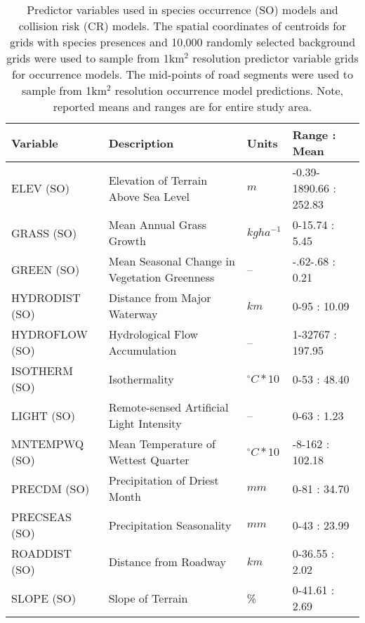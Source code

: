 \begin{table}[htp]
\caption[Predictor variables used in species occurrence models and collision risk models]{Predictor variables used in species occurrence (SO) models and collision risk (CR) models. The spatial coordinates of centroids for grids with species presences and 10,000 randomly selected background grids were used to sample from 1km$^2$ resolution predictor variable grids for occurrence models. The mid-points of road segments were used to sample from 1km$^2$ resolution occurrence model predictions. Note, reported means and ranges are for entire study area.}
\centering
\begin{tabularx}{0.9\textwidth}{lYll} \toprule
Variable       &Description                                               &Units          &Range : Mean\\
\midrule 
ELEV (SO)       &Elevation of Terrain Above Sea Level                     &$m$			  &-0.39-1890.66 : 252.83\\
GRASS (SO)      &Mean Annual Grass Growth \citep{cart03}	              &$kg ha^{-1}$   &0-15.74 : 5.45\\
GREEN (SO)      &Mean Seasonal Change in Vegetation Greenness             &--             &-.62-.68 : 0.21\\
HYDRODIST (SO)  &Distance from Major Waterway                             &$km$           &0-95 : 10.09\\
HYDROFLOW (SO)  &Hydrological Flow Accumulation                           &--             &1-32767 : 197.95\\
ISOTHERM (SO)   &Isothermality                                            &$^{\circ}C*10$ &0-53 : 48.40\\
LIGHT (SO)      &Remote-sensed Artificial Light Intensity                 &--             &0-63 : 1.23\\
MNTEMPWQ (SO)   &Mean Temperature of Wettest Quarter                      &$^{\circ}C*10$ &-8-162 : 102.18\\
PRECDM (SO)     &Precipitation of Driest Month                            &$mm$           &0-81 : 34.70\\
PRECSEAS (SO)   &Precipitation Seasonality                                &$mm$           &0-43 : 23.99\\
ROADDIST (SO)   &Distance from Roadway                                    &$km$           &0-36.55 : 2.02\\
SLOPE (SO)      &Slope of Terrain                                         &\%             &0-41.61 : 2.69\\

\end{tabularx}
\end{table}
